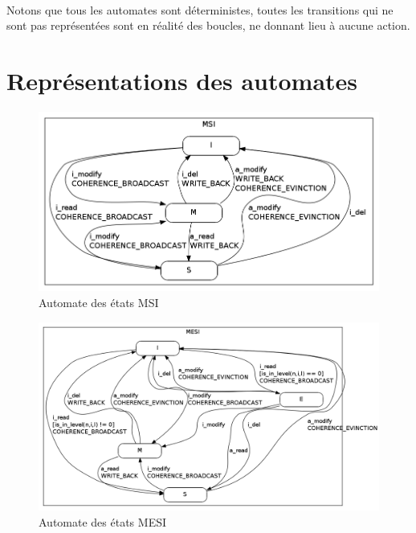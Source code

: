 \paragraph{}
Notons que tous les automates sont déterministes, toutes les transitions qui ne sont pas représentées sont en réalité des boucles, ne donnant lieu à aucune action.


\section{Représentations des automates}

\begin{figure}[!h]
\begin{center}
   \includegraphics[scale=0.45]{images/MSI_simple.png}
   \caption{\label{img:state_msi} Automate des états MSI}
\end{center}
\end{figure}


\begin{figure}[!h]
\begin{center}
   \includegraphics[scale=0.4]{images/MESI_simple.png}
   \caption{\label{img:state_mesi} Automate des états MESI}
\end{center}
\end{figure}


